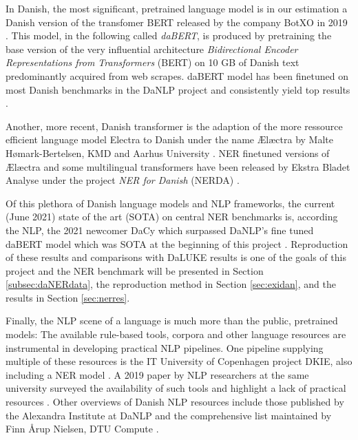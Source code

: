 \documentclass[main.tex]{subfiles}
\begin{document}
In Danish, the most significant, pretrained language model is in our estimation a Danish version of the transfomer BERT released by the company BotXO in 2019 \cite{botxo2019dabert} .
This model, in the following called \emph{daBERT}, is produced by pretraining the base version of the very influential architecture \emph{Bidirectional Encoder Representations from Transformers} (BERT) \cite{devlin2019bert} on 10 GB of Danish text predominantly acquired from web scrapes.
daBERT model has been finetuned on most Danish benchmarks in the DaNLP project and consistently yield top results \cite{danlp2021, hvingelby2020dane}.

Another, more recent, Danish transformer is the adaption of the more ressource efficient language model Electra to Danish under the name Ælæctra by Malte Hømark-Bertelsen, KMD and Aarhus University \cite{bertelsen2020lctra}.
NER finetuned versions of Ælæctra and some multilingual transformers have been released by Ekstra Bladet Analyse under the project \emph{NER for Danish} (NERDA) \cite{kjeldgaard2020nerda}.

Of this plethora of Danish language models and NLP frameworks, the current (June 2021) state of the art (SOTA) on central NER benchmarks is, according the NLP, the 2021 newcomer DaCy which surpassed DaNLP's fine tuned daBERT model which was SOTA at the beginning of this project \footnotemark.
Reproduction of these results and comparisons with DaLUKE results is one of the goals of this project and the NER benchmark will be presented in Section \ref{subsec:daNERdata}, the reproduction method in Section \ref{sec:exidan}, and the results in Section \ref{sec:nerres}.

Finally, the NLP scene of a language is much more than the public, pretrained models:
The available rule-based tools, corpora and other language resources are instrumental in developing practical NLP pipelines.
One pipeline supplying multiple of these resources is the IT University of Copenhagen project DKIE, also including a NER model \cite{derc2014dkie}.
A 2019 paper by NLP researchers at the same university surveyed the availability of such tools and highlight a lack of practical resources \cite{kirkedal2019lacunae}.
Other overviews of Danish NLP resources include those published by the Alexandra Institute at DaNLP \cite{danlp2021} and the comprehensive list maintained by Finn Årup Nielsen, DTU Compute \cite{arup21awesome}.
\end{document}
